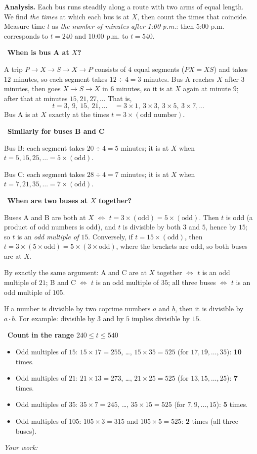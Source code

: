 \documentclass[11pt]{article}
\newif\ifsol \solfalse
\newcommand{\probsol}[1]{%
  \begin{lrbox}{\solmeasure}\begin{minipage}{\dimexpr\linewidth-24pt\relax}#1\end{minipage}\end{lrbox}%
  \ifsol
    \begin{solbox}#1\end{solbox}%
  \else
    \setlength{\solht}{\dimexpr\ht\solmeasure+\dp\solmeasure+0.85cm\relax}%
    \ifdim\solht<1.35cm\setlength{\solht}{1.35cm}\fi
    \ifdim\solht>\StudentMaxWork\setlength{\solht}{\StudentMaxWork}\fi
    \begin{tcolorbox}[colback=white,colframe=Line,boxrule=0.8pt,arc=5pt,
      left=8pt,right=8pt,top=4pt,bottom=4pt,height=\solht]{\footnotesize\color{Slate}\itshape\WorkWord}\end{tcolorbox}%
  \fi}
\newlength{\StudentMaxWork}\setlength{\StudentMaxWork}{7.5cm}
\newcommand{\step}[2]{\par\smallskip\noindent{\bfseries\color{tmBlue!85!black}\StepWord~#1.}\ {\bfseries #2}\par\nopagebreak}
\def\WorkWord{Your work:}
\def\StepWord{Step}
\begin{document}
\probsol{
\textbf{Analysis.} Each bus runs steadily along a route with two arms of equal length. We find \emph{the times} at which each bus is at $X$, then count the times that coincide. Measure time $t$ as \emph{the number of minutes after 1:00 p.m.}: then 5:00 p.m. corresponds to $t=240$ and 10:00 p.m. to $t=540$.

\step{1}{When is bus A at $X$?}
A trip $P\to X\to S\to X\to P$ consists of $4$ equal segments ($PX=XS$) and takes $12$ minutes, so each segment takes $12\div 4=3$ minutes. Bus A reaches $X$ after $3$ minutes, then goes $X\to S\to X$ in $6$ minutes, so it is at $X$ again at minute $9$; after that at minutes $15, 21, 27,\dots$ That is,
\[ t=3,\ 9,\ 15,\ 21,\dots \quad = 3\times 1,\ 3\times 3,\ 3\times 5,\ 3\times 7,\dots \]
Bus A is at $X$ exactly at the times $t=3\times(\text{odd number})$.

\step{2}{Similarly for buses B and C}
Bus B: each segment takes $20\div 4=5$ minutes; it is at $X$ when $t=5,15,25,\dots=5\times(\text{odd})$.\par
Bus C: each segment takes $28\div 4=7$ minutes; it is at $X$ when $t=7,21,35,\dots=7\times(\text{odd})$.

\step{3}{When are two buses at $X$ together?}
\begin{proofbox}Buses A and B are both at $X$ $\iff$ $t=3\times(\text{odd})=5\times(\text{odd})$. Then $t$ is odd (a product of odd numbers is odd), and $t$ is divisible by both $3$ and $5$, hence by $15$; so $t$ is an \emph{odd multiple of $15$}. Conversely, if $t=15\times(\text{odd})$, then $t=3\times(5\times\text{odd})=5\times(3\times\text{odd})$, where the brackets are odd, so both buses are at $X$.\end{proofbox}
By exactly the same argument: A and C are at $X$ together $\iff$ $t$ is an odd multiple of $21$; B and C $\iff$ $t$ is an odd multiple of $35$; all three buses $\iff$ $t$ is an odd multiple of $105$.
\begin{recallbox}If a number is divisible by two coprime numbers $a$ and $b$, then it is divisible by $a\cdot b$. For example: divisible by $3$ and by $5$ implies divisible by $15$.\end{recallbox}

\step{4}{Count in the range $240\le t\le 540$}
\begin{itemize}[leftmargin=1.3em,itemsep=1pt]
\item Odd multiples of $15$: $15\times 17=255$, \dots, $15\times 35=525$ (for $17,19,\dots,35$): \textbf{10} times.
\item Odd multiples of $21$: $21\times 13=273$, \dots, $21\times 25=525$ (for $13,15,\dots,25$): \textbf{7} times.
\item Odd multiples of $35$: $35\times 7=245$, \dots, $35\times 15=525$ (for $7,9,\dots,15$): \textbf{5} times.
\item Odd multiples of $105$: $105\times 3=315$ and $105\times 5=525$: \textbf{2} times (all three buses).
\end{itemize}

}
\end{document}
